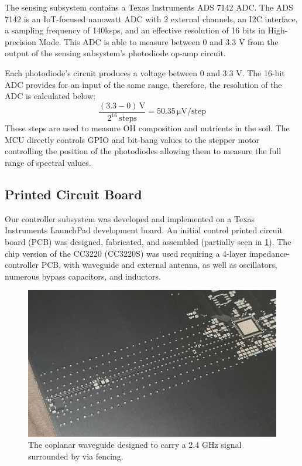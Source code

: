 \documentclass[journal]{IEEEtran}
\begin{document}
The sensing subsystem contains a Texas Instruments ADS 7142 ADC. The ADS 7142 is an IoT-focused nanowatt ADC with 2 external channels, an I2C interface, a sampling frequency of 140ksps, and an effective resolution of 16 bits in High-precision Mode. This ADC is able to measure between 0 and 3.3 V from the output of the sensing subsystem's photodiode op-amp circuit.

Each photodiode's circuit produces a voltage between 0 and 3.3 V. The 16-bit ADC provides for an input of the same range, therefore, the resolution of the ADC is calculated below:
\begin{equation}
	\frac{(3.3 - 0)\,\mathrm{V}}{2^{16}\,\mathrm{steps}} =
	50.35\,\mathrm{\mu V}/\mathrm{step}
\end{equation}
These steps are used to measure OH composition and nutrients in the soil. The MCU directly controls GPIO and bit-bang values to the stepper motor controlling the position of the photodiodes allowing them to measure the full range of spectral values.
\subsection{Printed Circuit Board} Our controller subsystem was developed and implemented on a Texas Instruments LaunchPad development board. An initial control printed circuit board (PCB) was designed, fabricated, and assembled (partially seen in \ref{fig:mcu_v1_cpwg}). The chip version of the CC3220 (CC3220S) was used requiring a 4-layer impedance-controller PCB, with waveguide and external antenna, as well as oscillators, numerous bypass capacitors, and inductors.

\begin{figure}[H]
   \centering
   \label{fig:mcu_v1_cpwg}
   \includegraphics[width=\linewidth]{images/mcu_v1_cpwg.jpg}
   \caption{The coplanar waveguide designed to carry a 2.4 GHz signal surrounded by via fencing.}
\end{figure}
\end{document}
